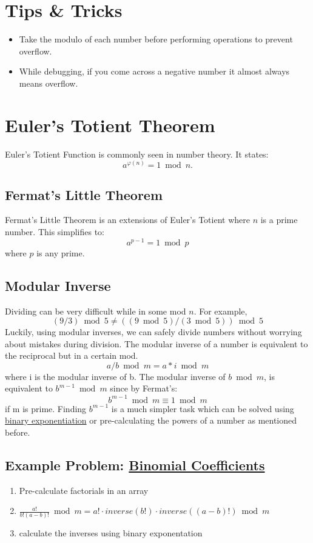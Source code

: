 \documentclass{article}
\begin{document}
\section{Tips \& Tricks}
    \begin{itemize}
        \item Take the modulo of each number before performing operations to prevent overflow.
        \item While debugging, if you come across a negative number it almost always means overflow.
    \end{itemize}
\section{Euler's Totient Theorem}
\hspace{1em} \quad Euler's Totient Function is commonly seen in number theory. It states:
    $$
    a^{ \varphi (n)} = 1 \bmod n.
    $$
\subsection{Fermat's Little Theorem}
    \hspace{1em} \quad Fermat's Little Theorem is an extensions of Euler's Totient where $n$ is a prime number. This simplifies to:
    $$
        a^{p-1} = 1 \bmod p
    $$
    where $p$ is any prime.
    \subsection{Modular Inverse}
        \hspace{1em} \quad Dividing can be very difficult while in some mod $n$. For example,
        $$
        (9/3) \bmod 5 \neq ((9 \bmod 5)/(3 \bmod 5)) \bmod 5
        $$
        Luckily, using modular inverses, we can safely divide numbers without worrying about mistakes during division. The modular inverse of a number is equivalent to the reciprocal but in a certain mod. 
        $$
        a/b \bmod m = a*i \bmod m
        $$
        where i is the modular inverse of b. The modular inverse of $b \bmod m$, is equivalent to $b^{m-1} \bmod m$ since by Fermat's:
        $$
        b^{m-1} \bmod m \equiv 1 \bmod m
        $$
        if m is prime. Finding $b^{m-1}$ is a much simpler task which can be solved using \href{https://cp-algorithms.com/algebra/binary-exp.html}{binary exponentiation} or pre-calculating the powers of a number as mentioned before.
    \subsection{Example Problem: \href{https://cses.fi/problemset/task/1079}{Binomial Coefficients}}
        \hspace{1em} \quad
        \begin{enumerate}
            \item Pre-calculate factorials in an array
            \item $\frac{a!}{b!(a-b)!} \bmod m = a! \cdot inverse(b!) \cdot inverse((a-b)!) \bmod m$
            \item calculate the inverses using binary exponentation
        \end{enumerate}
\end{document}
